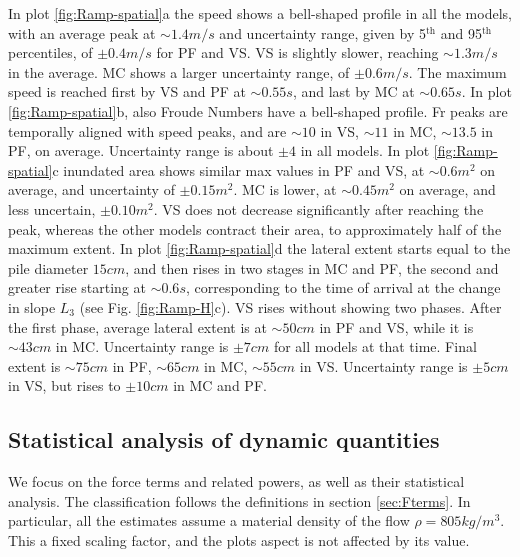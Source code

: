 \documentclass{article}
\begin{document}
In plot \ref{fig:Ramp-spatial}a the speed shows a bell-shaped profile in all the models, with an average peak at $\sim 1.4 m/s$ and uncertainty range, given by 5$^{\mathrm{th}}$ and 95$^{\mathrm{th}}$ percentiles, of $\pm 0.4 m/s$ for PF and VS. VS is slightly slower, reaching $\sim 1.3 m/s$ in the average. MC shows a larger uncertainty range, of $\pm 0.6 m/s$. The maximum speed is reached first by VS and PF at $\sim 0.55 s$, and last by MC at $\sim 0.65 s$. In plot \ref{fig:Ramp-spatial}b, also Froude Numbers have a bell-shaped profile. Fr peaks are temporally aligned with speed peaks, and are $\sim 10$ in VS, $\sim 11$ in MC, $\sim 13.5$ in PF, on average. Uncertainty range is about $\pm 4$ in all models. In plot \ref{fig:Ramp-spatial}c inundated area shows similar max values in PF and VS, at $\sim 0.6 m^2$ on average, and uncertainty of $\pm 0.15 m^2$. MC is lower, at $\sim 0.45 m^2$ on average, and less uncertain, $\pm 0.10 m^2$. VS does not decrease significantly after reaching the peak, whereas the other models contract their area, to approximately half of the maximum extent. In plot \ref{fig:Ramp-spatial}d the lateral extent starts equal to the pile diameter $15 cm$, and then rises in two stages in MC and PF, the second and greater rise starting at $\sim 0.6 s$, corresponding to the time of arrival at the change in slope $L_3$ (see Fig. \ref{fig:Ramp-H}c). VS rises without showing two phases. After the first phase, average lateral extent is at $\sim 50 cm$ in PF and VS, while it is $\sim 43 cm$ in MC. Uncertainty range is $\pm 7 cm$ for all models at that time. Final extent is $\sim 75 cm$ in PF, $\sim 65 cm$ in MC, $\sim 55 cm$ in VS. Uncertainty range is $\pm 5 cm$ in VS, but rises to $\pm 10 cm$ in MC and PF.

\subsection{Statistical analysis of dynamic quantities}\label{Hq1}
We focus on the force terms and related powers, as well as their statistical analysis. The classification follows the definitions in section \ref{sec:Fterms}. In particular, all the estimates assume a material density of the flow $\rho = 805 kg/m^3$. This a fixed scaling factor, and the plots aspect is not affected by its value.
\end{document}
